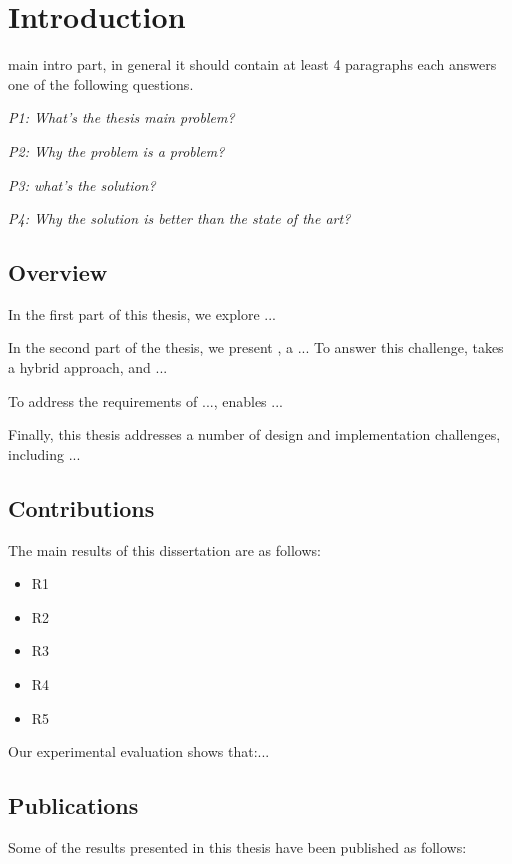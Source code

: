 %
\chapter{Introduction}
\label{sec:intro}

main intro part, in general it should contain at least 4 paragraphs each answers one of the following questions.

\emph{P1: What's the thesis main problem?}

\emph{P2: Why the problem is a problem?}

\emph{P3: what's the solution?}

\emph{P4: Why the solution is better than the state of the art?}

\section{Overview}
\label{sec:intro:overview}

In the first part of this thesis,
we explore ...

In the second part of the thesis,
we present \system{},
a ...
To answer this challenge, \system{} takes a hybrid approach, and
...

To address the requirements of ..., \system{}
enables ...

Finally, this thesis addresses a number of design and implementation
challenges, including ...

\section{Contributions}
\label{sec:intro:contributions}

The main results of this dissertation are as follows:
\begin{itemize}[leftmargin=*]
\item
  R1
\item
  R2
\item
  R3
\item
  R4
\item
  R5
\end{itemize}

Our experimental evaluation shows that:...

\section{Publications}
\label{sec:intro:publications}

Some of the results presented in this thesis have been published as follows:

